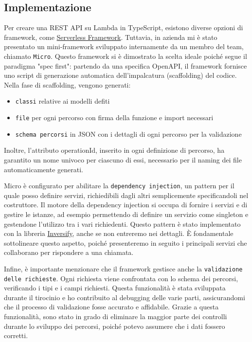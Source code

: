 \subsection{Implementazione}
Per creare una REST API su Lambda in TypeScript, esistono diverse opzioni di framework, come \href{https://www.serverless.com/framework/docs-providers-aws-events-apigateway}{Serverless Framework}. Tuttavia, in azienda mi è stato presentato un mini-framework sviluppato internamente da un membro del team, chiamato \texttt{Micro}. Questo framework si è dimostrato la scelta ideale poiché segue il paradigma "spec first": partendo da una specifica OpenAPI, il framework fornisce uno script di generazione automatica dell'impalcatura (scaffolding) del codice. 
Nella fase di scaffolding, vengono generati:
\begin{itemize}
    \item \texttt{classi} relative ai modelli defiti
    \item \texttt{file} per ogni percorso con firma della funzione e import necessari
    \item \texttt{schema percorsi} in JSON con i dettagli di ogni percorso per la validazione
\end{itemize}


Inoltre, l'attributo operationId, inserito in ogni definizione di percorso, ha garantito un nome univoco per ciascuno di essi, necessario per il naming dei file automaticamente generati.

Micro è configurato per abilitare la \texttt{dependency injection}, un pattern per il quale posso definire servizi, richiedibili dagli altri semplicemente specificandoli nel costruttore. Il motore della dependency injection si occupa di fornire i servizi e di gestire le istanze, ad esempio permettendo di definire un servizio come singleton e gestendone l'utilizzo tra i vari richiedenti. Questo pattern è stato implementato con la libreria \href{https://inversify.io/}{Inversify}, anche se non entreremo nei dettagli. È fondamentale sottolineare questo aspetto, poiché presenteremo in seguito i principali servizi che collaborano per rispondere a una chiamata.

Infine, è importante menzionare che il framework gestisce anche la \texttt{validazione delle richieste}. Ogni richiesta viene confrontata con lo schema dei percorsi, verificando i tipi e i campi richiesti. Questa funzionalità è stata sviluppata durante il tirocinio e ho contribuito al debugging delle varie parti, assicurandomi che il processo di validazione fosse accurato e affidabile. Grazie a questa funzionalità, sono stato in grado di eliminare la maggior parte dei controlli durante lo sviluppo dei percorsi, poiché potevo assumere che i dati fossero corretti.

